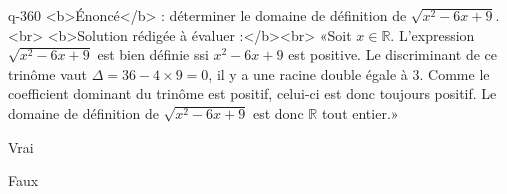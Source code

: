 \begin{truefalse}{q-360}
<b>Énoncé</b> : déterminer le domaine de définition de $\sqrt{x^2-6x+9}$.<br> <b>Solution rédigée à évaluer :</b><br>  «Soit $x\in\mathbb{R}$.  L'expression $\sqrt{x^2-6x+9}$ est bien définie ssi $x^2-6x+9$ est positive. Le discriminant de ce trinôme vaut $\Delta = 36-4\times 9 = 0$, il y a une racine double égale à $3$. Comme le coefficient dominant du trinôme est positif, celui-ci est donc toujours positif. Le domaine de définition de $\sqrt{x^2-6x+9}$ est donc $\mathbb{R}$ tout entier.»
\item* Vrai
\item Faux
\end{truefalse}

